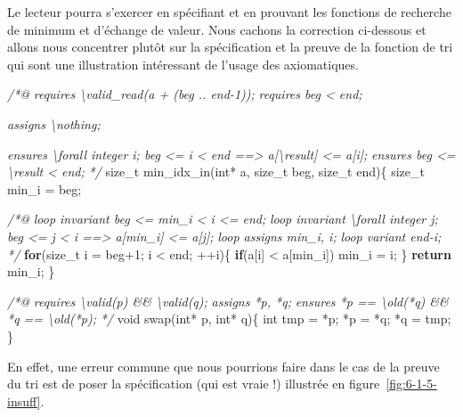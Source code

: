 \documentclass[12pt,francais,]{scrbook}
\newenvironment{Shaded}{}{}
\newcommand{\KeywordTok}[1]{\textcolor[rgb]{0.00,0.44,0.13}{\textbf{{#1}}}}
\newcommand{\DataTypeTok}[1]{\textcolor[rgb]{0.56,0.13,0.00}{{#1}}}
\newcommand{\DecValTok}[1]{\textcolor[rgb]{0.25,0.63,0.44}{{#1}}}
\newcommand{\CommentTok}[1]{\textcolor[rgb]{0.38,0.63,0.69}{\textit{{#1}}}}
\newcommand{\NormalTok}[1]{{#1}}
\newenvironment{zdssecretblock}[1]{%
  \tcolorbox[beamer,%
    noparskip,breakable,
    colback=LightGray,colframe=DarkGray,%
    colbacklower=LightGray,%
    title=#1]
}{\endtcolorbox}
\begin{document}
Le lecteur pourra s'exercer en spécifiant et en prouvant les fonctions
de recherche de minimum et d'échange de valeur. Nous cachons la
correction ci-dessous et allons nous concentrer plutôt sur la
spécification et la preuve de la fonction de tri qui sont une
illustration intéressant de l'usage des axiomatiques.

\begin{zdssecretblock}{Solution}
  \begin{footnotesize}
  \begin{footnotesize}\begin{Shaded}
\begin{Highlighting}[]
\CommentTok{/*@}
\CommentTok{  requires \textbackslash{}valid_read(a + (beg .. end-1));}
\CommentTok{  requires beg < end;}

\CommentTok{  assigns  \textbackslash{}nothing;}

\CommentTok{  ensures  \textbackslash{}forall integer i; beg <= i < end ==> a[\textbackslash{}result] <= a[i];}
\CommentTok{  ensures  beg <= \textbackslash{}result < end;}
\CommentTok{*/}
\NormalTok{size_t min_idx_in(}\DataTypeTok{int}\NormalTok{* a, size_t beg, size_t end)\{}
  \NormalTok{size_t min_i = beg;}

  \CommentTok{/*@}
\CommentTok{    loop invariant beg <= min_i < i <= end;}
\CommentTok{    loop invariant \textbackslash{}forall integer j; beg <= j < i ==> a[min_i] <= a[j];}
\CommentTok{    loop assigns min_i, i;}
\CommentTok{    loop variant end-i;}
\CommentTok{  */}
  \KeywordTok{for}\NormalTok{(size_t i = beg}\DecValTok{+1}\NormalTok{; i < end; ++i)\{}
    \KeywordTok{if}\NormalTok{(a[i] < a[min_i]) min_i = i;}
  \NormalTok{\}}
  \KeywordTok{return} \NormalTok{min_i;}
\NormalTok{\}}

\CommentTok{/*@}
\CommentTok{  requires \textbackslash{}valid(p) && \textbackslash{}valid(q);}
\CommentTok{  assigns  *p, *q;}
\CommentTok{  ensures  *p == \textbackslash{}old(*q) && *q == \textbackslash{}old(*p);}
\CommentTok{*/}
\DataTypeTok{void} \NormalTok{swap(}\DataTypeTok{int}\NormalTok{* p, }\DataTypeTok{int}\NormalTok{* q)\{}
  \DataTypeTok{int} \NormalTok{tmp = *p; *p = *q; *q = tmp;}
\NormalTok{\}}
\end{Highlighting}
  \end{Shaded}\end{footnotesize}
  \end{footnotesize}
\end{zdssecretblock}

En effet, une erreur commune que nous pourrions faire dans le cas de la
preuve du tri est de poser la spécification (qui est vraie !) illustrée
en figure~\ref{fig:6-1-5-insuff}.
\end{document}
